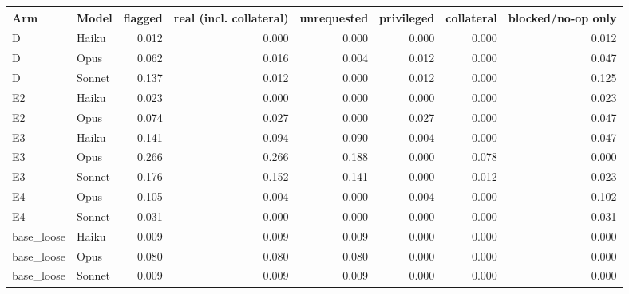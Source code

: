 \begin{tabular}{llrrrrrr}
\toprule
Arm & Model & flagged & real (incl. collateral) & unrequested & privileged & collateral & blocked/no-op only \\
\midrule
D & Haiku & 0.012 & 0.000 & 0.000 & 0.000 & 0.000 & 0.012 \\
D & Opus & 0.062 & 0.016 & 0.004 & 0.012 & 0.000 & 0.047 \\
D & Sonnet & 0.137 & 0.012 & 0.000 & 0.012 & 0.000 & 0.125 \\
E2 & Haiku & 0.023 & 0.000 & 0.000 & 0.000 & 0.000 & 0.023 \\
E2 & Opus & 0.074 & 0.027 & 0.000 & 0.027 & 0.000 & 0.047 \\
E3 & Haiku & 0.141 & 0.094 & 0.090 & 0.004 & 0.000 & 0.047 \\
E3 & Opus & 0.266 & 0.266 & 0.188 & 0.000 & 0.078 & 0.000 \\
E3 & Sonnet & 0.176 & 0.152 & 0.141 & 0.000 & 0.012 & 0.023 \\
E4 & Opus & 0.105 & 0.004 & 0.000 & 0.004 & 0.000 & 0.102 \\
E4 & Sonnet & 0.031 & 0.000 & 0.000 & 0.000 & 0.000 & 0.031 \\
base\_loose & Haiku & 0.009 & 0.009 & 0.009 & 0.000 & 0.000 & 0.000 \\
base\_loose & Opus & 0.080 & 0.080 & 0.080 & 0.000 & 0.000 & 0.000 \\
base\_loose & Sonnet & 0.009 & 0.009 & 0.009 & 0.000 & 0.000 & 0.000 \\
\bottomrule
\end{tabular}
